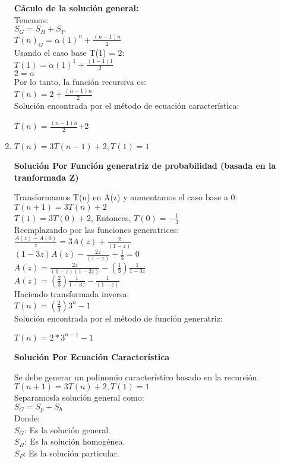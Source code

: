 \documentclass{article}
\begin{document}
\begin{enumerate}[label=\textbf{\alph*.}]
  \textbf{C\'aculo de la soluci\'on general:}\\
  Tenemos:\\
  $S_G = S_H + S_P$\\
  $T(n)_G = \alpha (1)^n + \frac{(n-1)n}{2}$\\
  Usando el caso base T(1) = 2:\\
  $T(1) = \alpha (1)^1 + \frac{(1-1)1}{2}$\\
  $2 = \alpha $\\
  Por lo tanto, la funci\'on recursiva es:\\
  $T(n) = 2 + \frac{(n-1)n}{2}$\\
  
  Soluci\'on encontrada por el m\'etodo de ecuaci\'on caracter\'istica:
  \begin{center}
    $T(n) = \frac{(n-1)n}{2}$+2
  \end{center}
  
  \item $T(n)=3T(n-1)+2, T(1)=1$
  
  \textbf{Soluci\'on Por Funci\'on generatriz de probabilidad (basada en la tranformada Z)}
  
  Transformamos T(n) en A(z) y aumentamos el caso base a 0:\\
  $T(n+1)=3T(n) + 2$\\
  $T(1) = 3T(0) + 2$, Entonces, $T(0)=-\frac{1}{3}$\\
  Reemplazando por las funciones generatrices:\\
  $\frac{A(z) - A(0)}{z} = 3A(z) + \frac{2}{(1-z)}$\\
  $(1-3z)A(z) - \frac{2z}{(1-z)} + \frac{1}{3}=0$\\
  $A(z) = \frac{2z}{(1-z)(1-3z)} - (\frac{1}{3})\frac{1}{1-3z}$\\
  $A(z) = (\frac{2}{3})\frac{1}{1-3z} - \frac{1}{(1-z)} $\\
  Haciendo transformada inversa:\\
  $T(n) = (\frac{2}{3})3^n -1$\\
  
  Soluci\'on encontrada por el m\'etodo de función generatriz:
  \begin{center}
    $T(n) = 2*3^{n-1} - 1$
  \end{center}
  
  \textbf{Soluci\'on Por Ecuaci\'on Caracter\'istica}
  
  Se debe generar un polinomio caracter\'istico basado en la recursi\'on.\\
  $T(n+1) = 3T(n) +2, T(1) = 1$\\
  Separamosla soluci\'on general como:\\
  $S_G = S_p + S_h$\\
  Donde:\\
  $S_G$: Es la soluci\'on general.\\
  $S_H$: Es la soluci\'on homog\'enea.\\
  $S_P$: Es la soluci\'on particular.\\
  

\end{enumerate}
\end{document}
